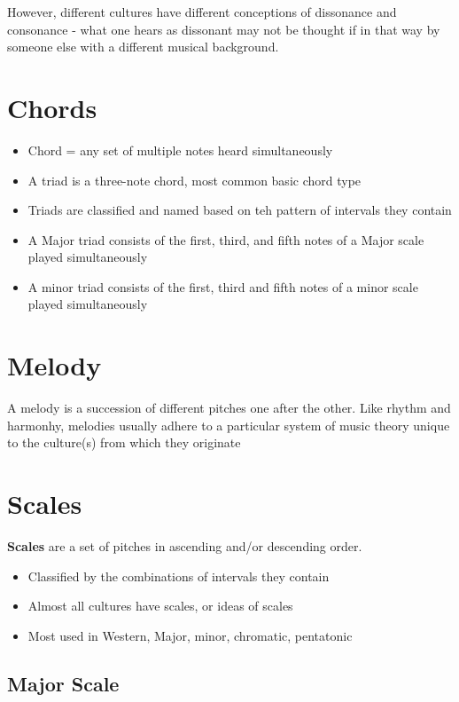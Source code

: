 \documentclass[12pt, a4paper]{report}
\begin{document}
  However, different cultures have different conceptions of dissonance and consonance - what one hears as dissonant may not be thought if in that way by someone else with a different musical background.

  \section{Chords}

  \begin{itemize}
    \item Chord = any set of multiple notes heard simultaneously
    \item A triad is a three-note chord, most common basic chord type
    \item Triads are classified and named based on teh pattern of intervals they contain
    \item A Major triad consists of the first, third, and fifth notes of a Major scale played simultaneously
    \item A minor triad consists of the first, third and fifth notes of a minor scale played simultaneously
  \end{itemize}

  \section{Melody}

  A melody is a succession of different pitches one after the other. Like rhythm and harmonhy, melodies usually adhere to a particular system of music theory unique to the culture(s) from which they originate

  \section{Scales}

  \textbf{Scales} are a set of pitches in ascending and/or descending order.

  \begin{itemize}
    \item Classified by the combinations of intervals they contain
    \item Almost all cultures have scales, or ideas of scales
    \item Most used in Western, Major, minor, chromatic, pentatonic
  \end{itemize}

  \subsection{Major Scale}
\end{document}
